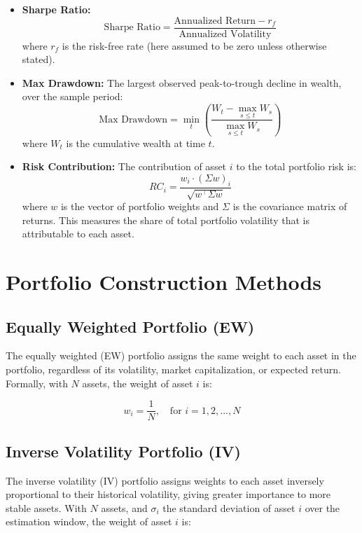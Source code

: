 \documentclass{article}
\begin{document}
\begin{itemize}
    \item \textbf{Sharpe Ratio:}
    \[
    \text{Sharpe Ratio} = \frac{\text{Annualized Return} - r_f}{\text{Annualized Volatility}}
    \]
    where $r_f$ is the risk-free rate (here assumed to be zero unless otherwise stated).

    \item \textbf{Max Drawdown:}  
    The largest observed peak-to-trough decline in wealth, over the sample period:
    \[
    \text{Max Drawdown} = \min_t \left( \frac{W_t - \max_{s \leq t} W_s}{\max_{s \leq t} W_s} \right)
    \]
    where $W_t$ is the cumulative wealth at time $t$.

    \item \textbf{Risk Contribution:}  
    \label{item:risk_contribution}
    The contribution of asset $i$ to the total portfolio risk is:
    \[
    RC_i = \frac{w_i \cdot (\Sigma w)_i}{\sqrt{w^\top \Sigma w}}
    \]
    where $w$ is the vector of portfolio weights and $\Sigma$ is the covariance matrix of returns.  
    This measures the share of total portfolio volatility that is attributable to each asset.
\end{itemize}



\newpage



\section{Portfolio Construction Methods}

\subsection{Equally Weighted Portfolio (EW)}



The equally weighted (EW) portfolio assigns the same weight to each asset in the portfolio, regardless of its volatility, market capitalization, or expected return. Formally, with \( N \) assets, the weight of asset \( i \) is:

\[
w_i = \frac{1}{N}, \quad \text{for } i = 1, 2, ..., N
\]



\subsection{Inverse Volatility Portfolio (IV)}

The inverse volatility (IV) portfolio assigns weights to each asset inversely proportional to their historical volatility, giving greater importance to more stable assets. With \( N \) assets, and \(\sigma_i\) the standard deviation of asset \(i\) over the estimation window, the weight of asset \( i \) is:
\end{document}
